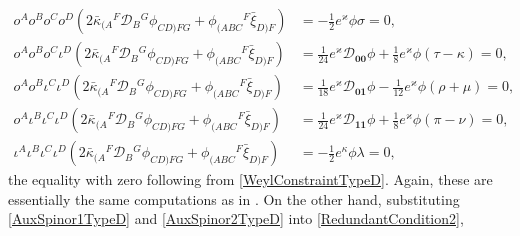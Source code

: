 \documentclass[10pt,a4paper]{article}
\newcommand\omicron{o}
\theoremstyle{plain}
\begin{document}
\begin{align*}
\omicron^A \omicron^B \omicron^C \omicron^D \left(2\bar{\kappa}_{(A}{}^{F}\mathcal{D}_{B}{}^{G}\phi_{CD)FG} + \phi_{(ABC}{}^{F}\bar{\xi}_{D)F}\right) 
&=- \tfrac{1}{2} e^{\varkappa}\phi \sigma=0,\\
\omicron^A \omicron^B \omicron^C \iota^D \left(2\bar{\kappa}_{(A}{}^{F}\mathcal{D}_{B}{}^{G}\phi_{CD)FG} + \phi_{(ABC}{}^{F}\bar{\xi}_{D)F}\right) & =\tfrac{1}{24} e^{\varkappa} \mathcal{D}_{\bm0\bm0}\phi + \tfrac{1}{8} e^{\varkappa}\phi (\tau - \kappa)  =0,\\
 \omicron^A \omicron^B \iota^C \iota^D \left(2\bar{\kappa}_{(A}{}^{F}\mathcal{D}_{B}{}^{G}\phi_{CD)FG} + \phi_{(ABC}{}^{F}\bar{\xi}_{D)F}\right) 
& = \tfrac{1}{18} e^{\varkappa} \mathcal{D}_{\bm0\bm1}\phi - \tfrac{1}{12} e^{\varkappa}\phi (\rho + \mu)  = 0,\\
 \omicron^A \iota^B \iota^C \iota^D \left(2\bar{\kappa}_{(A}{}^{F}\mathcal{D}_{B}{}^{G}\phi_{CD)FG} + \phi_{(ABC}{}^{F}\bar{\xi}_{D)F}\right) & =\tfrac{1}{24} e^{\varkappa} \mathcal{D}_{\bm1\bm1}\phi + \tfrac{1}{8} e^{\varkappa} \phi(\pi-\nu)  = 0,\\
 \iota^A \iota^B \iota^C \iota^D \left(2\bar{\kappa}_{(A}{}^{F}\mathcal{D}_{B}{}^{G}\phi_{CD)FG} + \phi_{(ABC}{}^{F}\bar{\xi}_{D)F}\right) & = - \tfrac{1}{2} e^{\kappa} \phi \lambda = 0,
\end{align*}
the equality with zero following from \eqref{WeylConstraintTypeD}. Again, these are essentially the same computations as in \cite{BaeVal10c}.
On the other hand, substituting \eqref{AuxSpinor1TypeD} and \eqref{AuxSpinor2TypeD} into \eqref{RedundantCondition2}, 
\end{document}
